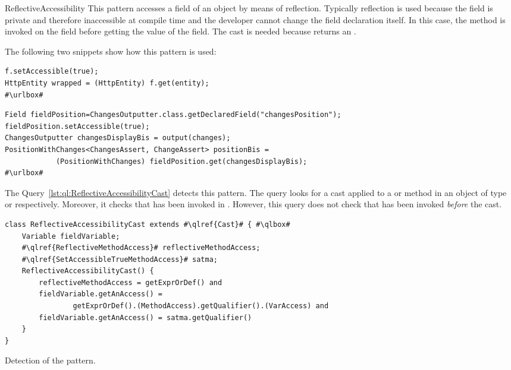 \begin{pattern}{ReflectiveAccessibility}
This pattern accesses a field of an object by means of reflection.
Typically reflection is used because the field is private and therefore
inaccessible at compile time and the developer cannot change the field
declaration itself.
In this case, the method  is invoked on the field
before getting the value of the field.
The cast is needed because  returns an .

\instances{}
The following two snippets show how this pattern is used:

\def\urlvar{http://bit.ly/loopj_android_async_http_2SOISRr}
\begin{verbatim}
f.setAccessible(true);
HttpEntity wrapped = (HttpEntity) f.get(entity);
#\urlbox#
\end{verbatim}

\def\urlvar{http://bit.ly/joel_costigliola_assertj_db_2Ip1Rho}
\begin{verbatim}
Field fieldPosition=ChangesOutputter.class.getDeclaredField("changesPosition");
fieldPosition.setAccessible(true);
ChangesOutputter changesDisplayBis = output(changes);
PositionWithChanges<ChangesAssert, ChangeAssert> positionBis = 
            (PositionWithChanges) fieldPosition.get(changesDisplayBis);
#\urlbox#
\end{verbatim}


\detection{}
The Query~\ref{lst:ql:ReflectiveAccessibilityCast} detects this pattern.
The query looks for a cast applied to a  or  method in an object  of type  or  respectively.
Moreover, it checks that  has been invoked in .
However, this query does not check that  has been invoked \emph{before} the cast.

\begin{listing}
\begin{verbatim}	
class ReflectiveAccessibilityCast extends #\qlref{Cast}# { #\qlbox#
	Variable fieldVariable;
    #\qlref{ReflectiveMethodAccess}# reflectiveMethodAccess;
	#\qlref{SetAccessibleTrueMethodAccess}# satma;
	ReflectiveAccessibilityCast() {
		reflectiveMethodAccess = getExprOrDef() and
		fieldVariable.getAnAccess() = 
                getExprOrDef().(MethodAccess).getQualifier().(VarAccess) and
		fieldVariable.getAnAccess() = satma.getQualifier()
	}
}
\end{verbatim}
\caption{Detection of the \thisp{} pattern.}
\label{lst:ql:ReflectiveAccessibilityCast}
\end{listing}



\end{pattern}
